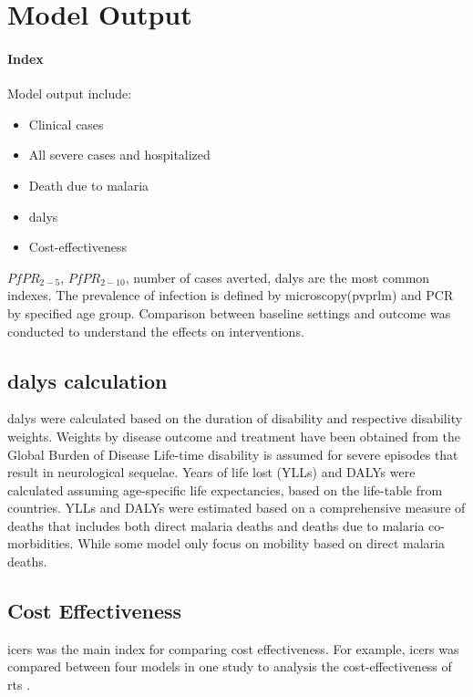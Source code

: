 \documentclass[a4paper, 12pt, twoside]{article}
\begin{document}
\section{Model Output}%
\label{sec:model_output}

\paragraph{Index}%
\label{par:index}
Model output include:
\begin{itemize}
	\item Clinical cases
	\item All severe cases and hospitalized
	\item Death due to malaria
	\item \gls{dalys}
	\item Cost-effectiveness
\end{itemize}
$PfPR_{2-5}$, $PfPR_{2-10}$\cite{Penny2016}, number of cases averted, \gls{dalys} are the most common indexes.
The prevalence of infection is defined by microscopy(\gls{pvprlm}) and PCR by specified age group.
Comparison between baseline settings and outcome was conducted to understand the effects on interventions.

\subsection{\texorpdfstring{\gls{dalys} calculation}{DALYs Calculation}}%
\label{sub:dalys_calcualtion}
\gls{dalys} were calculated based on the duration of disability and respective disability weights.
Weights by disease outcome and treatment have been obtained from the Global Burden of Disease Life-time disability is assumed for severe episodes that result in neurological sequelae.
Years of life lost (YLLs) and DALYs were calculated assuming age-specific life expectancies, based on the life-table from countries.
YLLs and DALYs were estimated based on a comprehensive measure of deaths that includes both direct malaria deaths and deaths due to malaria co-morbidities.
While some model only focus on mobility based on direct malaria deaths.

\subsection{Cost Effectiveness}%
\label{sub:cost_effectiveness}
\gls{icers} was the main index for comparing cost effectiveness.
For example, \gls{icers} was compared between four models in one study to analysis the cost-effectiveness of \gls{rts} \cite{Hay2004}.
\end{document}
